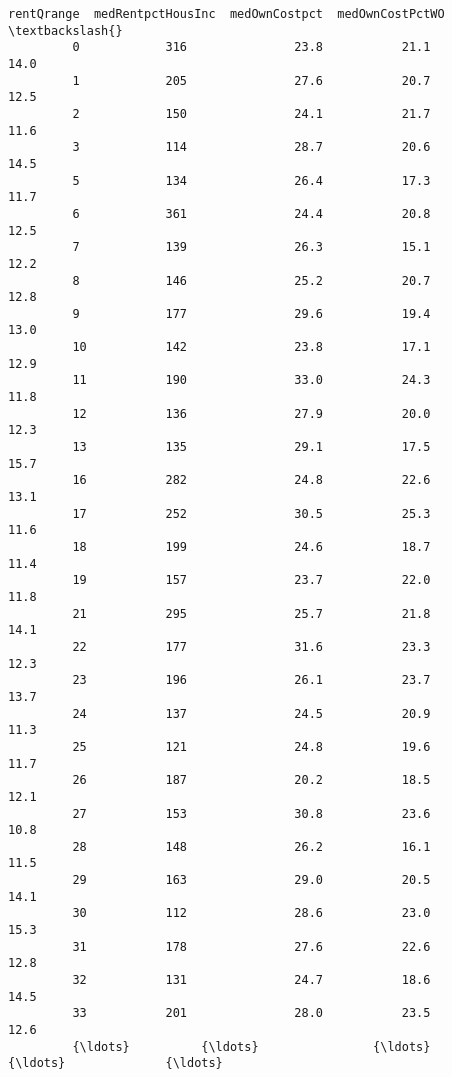 \documentclass[11pt]{llncs}
\begin{document}
\begin{Verbatim}[commandchars=\\\{\}]
               rentQrange  medRentpctHousInc  medOwnCostpct  medOwnCostPctWO  \textbackslash{}
         0            316               23.8           21.1             14.0   
         1            205               27.6           20.7             12.5   
         2            150               24.1           21.7             11.6   
         3            114               28.7           20.6             14.5   
         5            134               26.4           17.3             11.7   
         6            361               24.4           20.8             12.5   
         7            139               26.3           15.1             12.2   
         8            146               25.2           20.7             12.8   
         9            177               29.6           19.4             13.0   
         10           142               23.8           17.1             12.9   
         11           190               33.0           24.3             11.8   
         12           136               27.9           20.0             12.3   
         13           135               29.1           17.5             15.7   
         16           282               24.8           22.6             13.1   
         17           252               30.5           25.3             11.6   
         18           199               24.6           18.7             11.4   
         19           157               23.7           22.0             11.8   
         21           295               25.7           21.8             14.1   
         22           177               31.6           23.3             12.3   
         23           196               26.1           23.7             13.7   
         24           137               24.5           20.9             11.3   
         25           121               24.8           19.6             11.7   
         26           187               20.2           18.5             12.1   
         27           153               30.8           23.6             10.8   
         28           148               26.2           16.1             11.5   
         29           163               29.0           20.5             14.1   
         30           112               28.6           23.0             15.3   
         31           178               27.6           22.6             12.8   
         32           131               24.7           18.6             14.5   
         33           201               28.0           23.5             12.6   
         {\ldots}          {\ldots}                {\ldots}            {\ldots}              {\ldots}   

\end{Verbatim}
\end{document}
